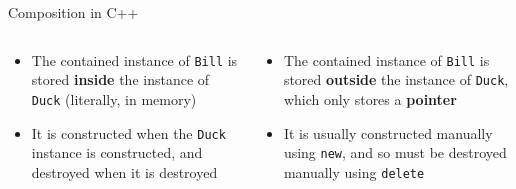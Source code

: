 \begin{frame}{Composition in C++}
    \begin{columns}
        \begin{column}{0.55\textwidth}
            \begin{itemize}
                \item The contained instance of \lstinline{Bill} is stored \textbf{inside} the
                    instance of \lstinline{Duck} (literally, in memory) \pause
                \item It is constructed when the \lstinline{Duck} instance is constructed,
                    and destroyed when it is destroyed \pause
            \end{itemize}
        \end{column}
        \begin{column}{0.5\textwidth}
            \begin{itemize}
                \item The contained instance of \lstinline{Bill} is stored \textbf{outside} the
                    instance of \lstinline{Duck}, which only stores a \textbf{pointer} \pause
                \item It is usually constructed manually using \lstinline{new},
                    and so must be destroyed manually using \lstinline{delete}
            \end{itemize}
        \end{column}
    \end{columns}
\end{frame}

